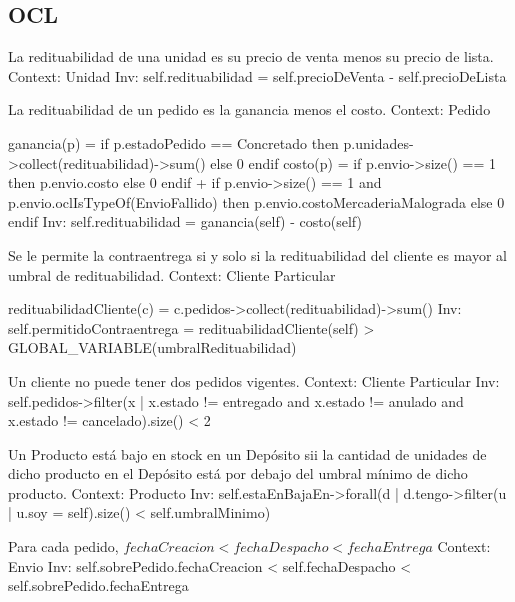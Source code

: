 \subsection{OCL}

\begin{listocl}
  \begin{itemocl}{La redituabilidad de una unidad es su precio de venta menos su precio de lista.}
Context: Unidad
Inv: self.redituabilidad = self.precioDeVenta - self.precioDeLista
  \end{itemocl}

  \begin{itemocl}{La redituabilidad de un pedido es la ganancia menos el costo.}
Context: Pedido

ganancia(p) = if p.estadoPedido == Concretado
	   then p.unidades->collect(redituabilidad)->sum()
	   else 0
	   endif
costo(p) = if p.envio->size() == 1
	then p.envio.costo
	else 0
	endif
	+ if p.envio->size() == 1 and p.envio.oclIsTypeOf(EnvioFallido)
	then p.envio.costoMercaderiaMalograda
	else 0
	endif
Inv: self.redituabilidad = ganancia(self) - costo(self)
  \end{itemocl}

  \begin{itemocl}{Se le permite la contraentrega si y solo si la redituabilidad del cliente es mayor al umbral de redituabilidad.}
Context: Cliente Particular

redituabilidadCliente(c) = c.pedidos->collect(redituabilidad)->sum()
Inv: self.permitidoContraentrega = redituabilidadCliente(self) > GLOBAL_VARIABLE(umbralRedituabilidad)
  \end{itemocl}

  \begin{itemocl}{Un cliente no puede tener dos pedidos vigentes.}
Context: Cliente Particular
Inv: self.pedidos->filter(x | x.estado != entregado and x.estado != anulado and x.estado != cancelado).size() < 2
  \end{itemocl}

  \begin{itemocl}{Un Producto está bajo en stock en un Depósito sii la cantidad de unidades de dicho producto en el Depósito está por debajo del umbral mínimo de dicho producto.}
Context: Producto
Inv: self.estaEnBajaEn->forall(d | d.tengo->filter(u | u.soy = self).size() < self.umbralMinimo)
  \end{itemocl}

  \begin{itemocl}{Para cada pedido, $fechaCreacion < fechaDespacho < fechaEntrega$}
Context: Envio
Inv: self.sobrePedido.fechaCreacion < self.fechaDespacho < self.sobrePedido.fechaEntrega
  \end{itemocl}


\end{listocl}
